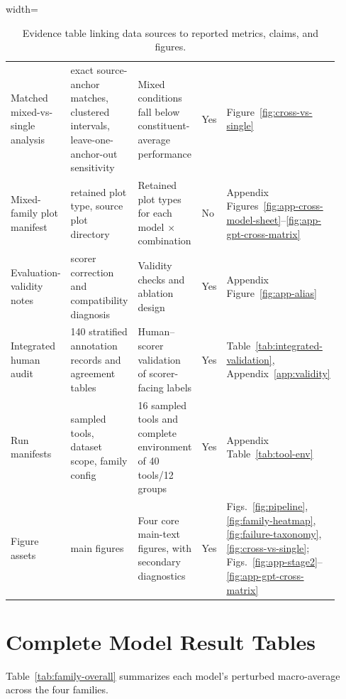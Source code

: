 \documentclass[11pt]{article}
\begin{document}
\begin{table}[htbp]
\begin{adjustbox}{width=\linewidth}
\begin{tabular}{p{0.28\linewidth} p{0.20\linewidth} p{0.25\linewidth} p{0.07\linewidth} p{0.12\linewidth}}
Matched mixed-vs-single analysis & exact source-anchor matches, clustered intervals, leave-one-anchor-out sensitivity & Mixed conditions fall below constituent-average performance & Yes & Figure~\ref{fig:cross-vs-single} \\
Mixed-family plot manifest & retained plot type, source plot directory & Retained plot types for each model $\times$ combination & No & Appendix Figures~\ref{fig:app-cross-model-sheet}--\ref{fig:app-gpt-cross-matrix} \\
Evaluation-validity notes & scorer correction and compatibility diagnosis & Validity checks and ablation design & Yes & Appendix Figure~\ref{fig:app-alias} \\
Integrated human audit & 140 stratified annotation records and agreement tables & Human--scorer validation of scorer-facing labels & Yes & Table~\ref{tab:integrated-validation}, Appendix~\ref{app:validity} \\
Run manifests & sampled tools, dataset scope, family config & 16 sampled tools and complete environment of 40 tools/12 groups & Yes & Appendix Table~\ref{tab:tool-env} \\
Figure assets & main figures & Four core main-text figures, with secondary diagnostics & Yes & Figs.~\ref{fig:pipeline}, \ref{fig:family-heatmap}, \ref{fig:failure-taxonomy}, \ref{fig:cross-vs-single}; Figs.~\ref{fig:app-stage2}--\ref{fig:app-gpt-cross-matrix} \\
\bottomrule
\end{tabular}
\end{adjustbox}
\caption{Evidence table linking data sources to reported metrics, claims, and figures.}
\label{tab:evidence}
\end{table}

\section{Complete Model Result Tables}
\label{app:model-results}

Table~\ref{tab:family-overall} summarizes each model's perturbed macro-average across the four families.
\end{document}
